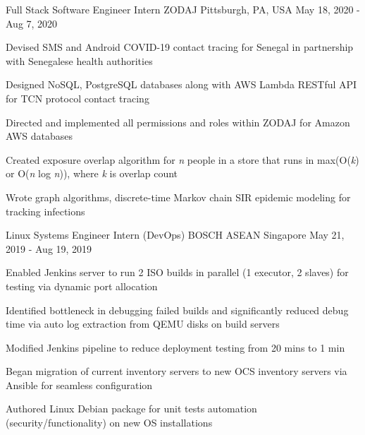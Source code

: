 \begin{cventries}
  \cventry
    {Full Stack Software Engineer Intern} %
    {ZODAJ} %
    {Pittsburgh, PA, USA} %
    {May 18, 2020 - Aug 7, 2020} %
    {
      \begin{cvitems} %
        \item {Devised SMS and Android COVID-19 contact tracing for Senegal
               in partnership with Senegalese health authorities}
        \item {Designed NoSQL, PostgreSQL databases along with AWS Lambda
               RESTful API for TCN protocol contact tracing}
        \item {Directed and implemented all permissions and roles within ZODAJ
               for Amazon AWS databases}
        \item {Created exposure overlap algorithm for \textit{n} people in a
               store that runs in max(O(\textit{k}) or O(\textit{n} log
               \textit{n})), where \textit{k} is overlap count}
        \item {Wrote graph algorithms, discrete-time Markov chain SIR epidemic
               modeling for tracking infections}
      \end{cvitems}
    }

  \cventry
    {Linux Systems Engineer Intern (DevOps)} %
    {BOSCH ASEAN} %
    {Singapore} %
    {May 21, 2019 - Aug 19, 2019} %
    {
      \begin{cvitems} %
        \item {Enabled Jenkins server to run 2 ISO builds in parallel
               (1 executor, 2 slaves) for testing via dynamic port allocation}
        \item {Identified bottleneck in debugging failed builds and significantly
               reduced debug time via
           auto log extraction from QEMU disks on build servers}
        \item {Modified Jenkins pipeline to reduce deployment testing from 20 mins to 1 min}
        \item {Began migration of current inventory servers to new OCS inventory servers via Ansible for seamless configuration}
        \item {Authored Linux Debian package for unit tests automation (security/functionality) on new OS installations}
      \end{cvitems}
    }


\end{cventries}
